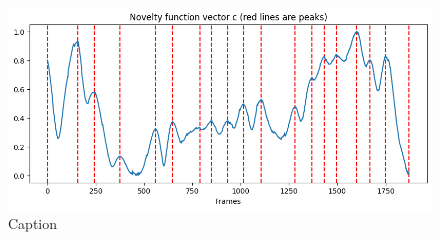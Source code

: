 \begin{figure}
    \centering
    \includegraphics[width=\textwidth]{figures/images/noveltypeaks_SALAMI_track_2.png}
    \caption[Novelty curve]{Caption}
    \label{fig:embeddiogram}
\end{figure}

